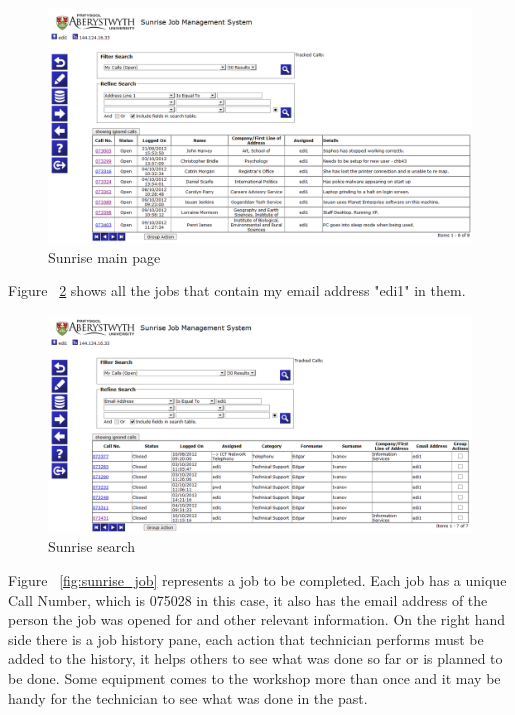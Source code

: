 \documentclass[10pt,a4paper,headinclude=true,twoside]{report}
\begin{document}
\begin{figure}[H]
\centering
\centerline{\includegraphics[scale=0.5]{./sunrise_main}}
\caption{Sunrise main page}
\label{fig:sunrise_main}
\end{figure}

Figure ~\ref{fig:sunrise_search} shows all the jobs that contain my email address "edi1" in them.

\begin{figure}[H]
\centering
\centerline{\includegraphics[scale=0.4]{./sunrise_search}}
\caption{Sunrise search}
\label{fig:sunrise_search}
\end{figure}

Figure ~\ref{fig:sunrise_job} represents a job to be completed. Each job has a unique Call Number, which is 075028 in this case, it also has the email address of the person the job was opened for and other relevant information. On the right hand side there is a job history pane, each action that technician performs must be added to the history, it helps others to see what was done so far or is planned to be done. Some equipment comes to the workshop more than once and it may be handy for the technician to see what was done in the past.
\end{document}
